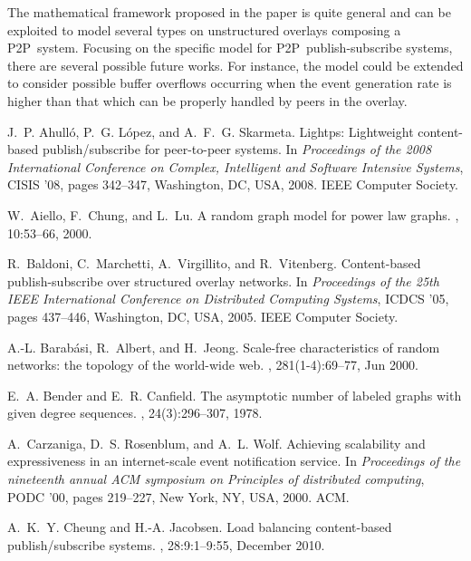 \documentclass[10pt, conference, compsocconf]{IEEEtran}
\begin{document}
The mathematical framework proposed in the paper is quite general and can be exploited to model several types on unstructured overlays composing a \ac{P2P}~system. Focusing on the specific model for \ac{P2P}~publish-subscribe systems, there are several possible future works. For instance, the model could be extended to consider possible buffer overflows occurring when the event generation rate is higher than that which can be properly handled by peers in the overlay.


\begin{thebibliography}{10}

J.~P. Ahull\'{o}, P.~G. L\'{o}pez, and A.~F.~G. Skarmeta.
\newblock Lightps: Lightweight content-based publish/subscribe for peer-to-peer
  systems.
\newblock In {\em Proceedings of the 2008 International Conference on Complex,
  Intelligent and Software Intensive Systems}, CISIS '08, pages 342--347,
  Washington, DC, USA, 2008. IEEE Computer Society.

W.~Aiello, F.~Chung, and L.~Lu.
\newblock A random graph model for power law graphs.
, 10:53--66, 2000.

R.~Baldoni, C.~Marchetti, A.~Virgillito, and R.~Vitenberg.
\newblock Content-based publish-subscribe over structured overlay networks.
\newblock In {\em Proceedings of the 25th IEEE International Conference on
  Distributed Computing Systems}, ICDCS '05, pages 437--446, Washington, DC,
  USA, 2005. IEEE Computer Society.

A.-L. Barab{\'a}si, R.~Albert, and H.~Jeong.
\newblock Scale-free characteristics of random networks: the topology of the
  world-wide web.
,
  281(1-4):69--77, Jun 2000.

E.~A. Bender and E.~R. Canfield.
\newblock The asymptotic number of labeled graphs with given degree sequences.
, 24(3):296--307, 1978.


A.~Carzaniga, D.~S. Rosenblum, and A.~L. Wolf.
\newblock Achieving scalability and expressiveness in an internet-scale event
  notification service.
\newblock In {\em Proceedings of the nineteenth annual ACM symposium on
  Principles of distributed computing}, PODC '00, pages 219--227, New York, NY,
  USA, 2000. ACM.

A.~K.~Y. Cheung and H.-A. Jacobsen.
\newblock Load balancing content-based publish/subscribe systems.
, 28:9:1--9:55, December 2010.


\end{thebibliography}
\end{document}
